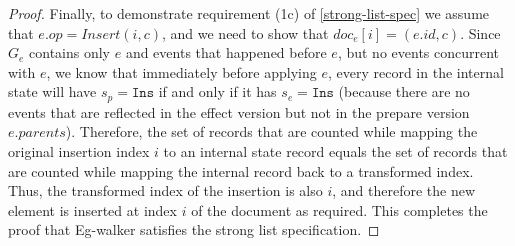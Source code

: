 \documentclass[sigplan,10pt]{acmart}
\newif\ifincludeappendix
\newcommand{\algname}{Eg-walker\xspace}
\begin{document}
\begin{proof}
  Finally, to demonstrate requirement (1c) of \autoref{strong-list-spec} we assume that $e.\mathit{op} = \mathit{Insert}(i,c)$, and we need to show that $\mathit{doc}_e [i] = (e.\mathit{id}, c)$.
  Since $G_e$ contains only $e$ and events that happened before $e$, but no events concurrent with $e$, we know that immediately before applying $e$, every record in the internal state will have $s_p = \texttt{Ins}$ if and only if it has $s_e = \texttt{Ins}$ (because there are no events that are reflected in the effect version but not in the prepare version $e.\mathit{parents}$).
  Therefore, the set of records that are counted while mapping the original insertion index $i$ to an internal state record equals the set of records that are counted while mapping the internal record back to a transformed index.
  Thus, the transformed index of the insertion is also $i$, and therefore the new element is inserted at index $i$ of the document as required.
  This completes the proof that \algname satisfies the strong list specification.
\end{proof}
\fi %
\end{document}
